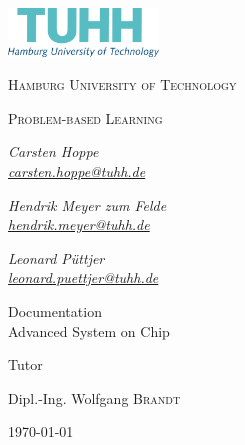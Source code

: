 \begin{titlepage}
	\centering
	\includegraphics[width=0.30\textwidth]{pictures/office_rgb_en.png}\par\vspace{1cm}
	{\scshape\LARGE Hamburg University of Technology \par}
	\vspace{1cm}
	{\scshape\Large Problem-based Learning\par}
	\vspace{1.5cm}
	{\huge\bfseries \thetitle\par}
	\vspace{1cm}
	{\Large\itshape {Carsten Hoppe} \\\href{mailto:carsten.hoppe@tuhh.de}{carsten.hoppe@tuhh.de}\par}
	\vspace{0.5cm}
	{\Large\itshape Hendrik Meyer zum Felde\\\href{mailto:hendrik.meyer@tuhh.de}{hendrik.meyer@tuhh.de}\par}
	\vspace{.5cm}
	{\Large\itshape Leonard Püttjer \\\href{mailto:leonard.puettjer@tuhh.de}{leonard.puettjer@tuhh.de}\par}
	
	\vfill	%
	Documentation	\\Advanced System on Chip \par
	
	\vfill	%
	Tutor\par
	Dipl.-Ing. Wolfgang \textsc{Brandt}

	\vfill

	{\large \today\par}
\end{titlepage}


